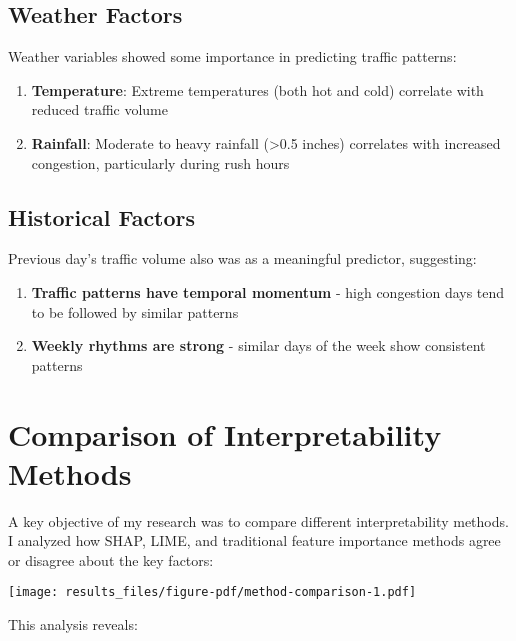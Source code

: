 \documentclass[
  letterpaper,
  DIV=11,
  numbers=noendperiod]{scrreprt}
\providecommand{\tightlist}{%
  \setlength{\itemsep}{0pt}\setlength{\parskip}{0pt}}\usepackage{longtable,booktabs,array}
\begin{document}
\subsection{Weather Factors}\label{weather-factors}

Weather variables showed some importance in predicting traffic patterns:

\begin{enumerate}
\def\labelenumi{\arabic{enumi}.}
\tightlist
\item
  \textbf{Temperature}: Extreme temperatures (both hot and cold)
  correlate with reduced traffic volume
\item
  \textbf{Rainfall}: Moderate to heavy rainfall (\textgreater0.5 inches)
  correlates with increased congestion, particularly during rush hours
\end{enumerate}

\subsection{Historical Factors}\label{historical-factors}

Previous day's traffic volume also was as a meaningful predictor,
suggesting:

\begin{enumerate}
\def\labelenumi{\arabic{enumi}.}
\tightlist
\item
  \textbf{Traffic patterns have temporal momentum} - high congestion
  days tend to be followed by similar patterns
\item
  \textbf{Weekly rhythms are strong} - similar days of the week show
  consistent patterns
\end{enumerate}

\section{Comparison of Interpretability
Methods}\label{comparison-of-interpretability-methods}

A key objective of my research was to compare different interpretability
methods. I analyzed how SHAP, LIME, and traditional feature importance
methods agree or disagree about the key factors:

\texttt{[image: results\_files/figure-pdf/method-comparison-1.pdf]}

This analysis reveals:
\end{document}
